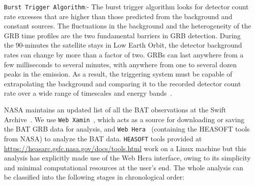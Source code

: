 \documentclass[prd,nofootinbib,preprintnumbers,floatfix]{revtex4}  %
\begin{document}
{\tt Burst Trigger Algorithm}:- The burst trigger algorithm looks for detector count rate excesses that are higher than those predicted from the background and constant sources. The fluctuations in the background and the heterogeneity of the GRB time profiles are the two fundamental barriers in GRB detection. During the 90-minutes the satellite stays in Low Earth Orbit, the detector background rates can change by more than a factor of two. GRBs can last anywhere from a few milliseconds to several minutes, with anywhere from one to several dozen peaks in the emission. As a result, the triggering system must be capable of extrapolating the background and comparing it to the recorded detector count rate over a wide range of timescales and energy bands~\cite{markwardt2007Swift}.



NASA maintains an updated list of all the  BAT observations at the  Swift Archive~\cite{SwiftArchive}. We use {\tt Web Xamin}~\cite{XaminWeb}, which acts as a source for downloading or saving the BAT GRB data for analysis, and {\tt Web Hera}~\cite{HeraWeb} (containing the HEASOFT tools from NASA) to analyze the BAT data. {\tt HEASOFT} tools provided at \url{https://heasarc.gsfc.nasa.gov/docs/tools.html} work on a Linux machine but this analysis has explicitly made use  of the Web Hera interface, owing to its simplicity and minimal computational resources at the user's end. The whole analysis can be classified into the following stages in chronological order:
\end{document}

